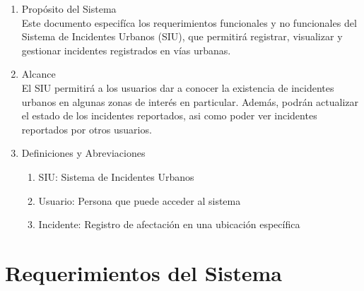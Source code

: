\documentclass{article}
\begin{document}
\begin{enumerate}
    \item Propósito del Sistema \\
    Este documento especifíca los requerimientos funcionales y no funcionales del Sistema de Incidentes Urbanos (SIU), que permitirá registrar, visualizar y gestionar incidentes registrados en vías urbanas.\\

    \item Alcance \\
    El SIU permitirá a los usuarios dar a conocer la existencia de incidentes urbanos en algunas zonas de interés en particular. Además, podrán actualizar el estado de los incidentes reportados, asi como poder ver incidentes reportados por otros usuarios.  \\

    \item Definiciones y Abreviaciones
        \begin{enumerate}
            \item SIU: Sistema de Incidentes Urbanos
            \item Usuario: Persona que puede acceder al sistema
            \item Incidente: Registro de afectación en una ubicación específica
        \end{enumerate}
     
\end{enumerate}

\section{Requerimientos del Sistema}
\end{document}
